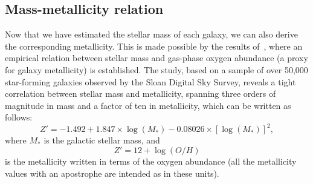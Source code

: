\subsection{Mass-metallicity relation}
Now that we have estimated the stellar mass of each galaxy, we can also derive the corresponding metallicity.
This is made possible by the results of~\cite{Tremonti}, where an empirical relation between stellar mass and gas-phase oxygen abundance (a proxy for galaxy metallicity) is established.
The study, based on a sample of over 50,000 star-forming galaxies observed by the Sloan Digital Sky Survey, reveals a tight correlation between stellar mass and metallicity, spanning three orders of magnitude in mass and a factor of ten in metallicity, which can be written as follows:
\begin{equation}
    Z' = -1.492 + 1.847\times\log(M_*) - 0.08026\times{[\log(M_*)]}^2,
    \label{eq: mass to metallicity relation}
\end{equation}
where $M_*$ is the galactic stellar mass, and 
\begin{equation}
    Z'= 12+\log(O/H)
    \label{eq: metalliticy weird units definition}
\end{equation}
is the metallicity written in terms of the oxygen abundance (all the metallicity values with an apostrophe are intended as in these units).

